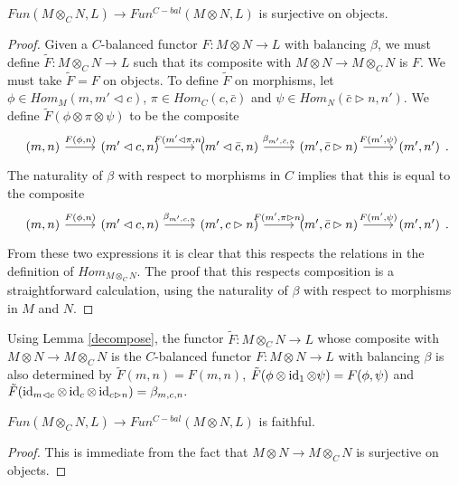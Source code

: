 \begin{lemma}
$Fun(M\otimes_C N,L)\to Fun^{C-bal}(M\otimes N,L)$ is surjective on objects.\end{lemma}
\begin{proof}

Given a $C$-balanced functor $F:M\otimes N \to L$ with balancing $\beta$, we must define $\tilde{F}:M\otimes_C N \to L$ such that its composite with $M\otimes N\to M\otimes_C N$ is $F$. We must take $\tilde{F}=F$ on objects. To define $\tilde{F}$ on morphisms, let $\phi\in Hom_M(m,m'\lhd c)$, $\pi\in Hom_C(c,\bar{c})$ and $\psi\in Hom_N(\bar{c}\rhd n,n')$. We define $\tilde{F}(\phi\otimes\pi\otimes\psi)$ to be the composite \[\begin{tikzcd}
	{(m,n)} & {(m'\lhd c,n)} & {(m'\lhd \bar{c},n)} & {(m',\bar{c}\rhd n)} & {(m',n')}
	\arrow["{F(\phi,n)}", from=1-1, to=1-2]
	\arrow["{F(m'\lhd\pi,n)}", from=1-2, to=1-3]
	\arrow["{\beta_{m',\bar{c},n}}", from=1-3, to=1-4]
	\arrow["{F(m',\psi)}", from=1-4, to=1-5]
\end{tikzcd}.\] The naturality of $\beta$ with respect to morphisms in $C$ implies that this is equal to the composite \[\begin{tikzcd}
	{(m,n)} & {(m'\lhd c,n)} & {(m', c\rhd n)} & {(m',\bar{c}\rhd n)} & {(m',n')}
	\arrow["{F(\phi,n)}", from=1-1, to=1-2]
	\arrow["{\beta_{m',c,n}}", from=1-2, to=1-3]
	\arrow["{F(m',\pi\rhd n)}", from=1-3, to=1-4]
	\arrow["{F(m',\psi)}", from=1-4, to=1-5]
\end{tikzcd}.\] From these two expressions it is clear that this respects the relations in the definition of $Hom_{M\otimes_C N}$. The proof that this respects composition is a straightforward calculation, using the naturality of $\beta$ with respect to morphisms in $M$ and $N$. \end{proof}

\begin{remark}
Using Lemma \ref{decompose}, the functor $\tilde{F}:M\otimes_C N\to L$ whose composite with $M\otimes N\to M\otimes_C N$ is the $C$-balanced functor $F:M\otimes N\to L$ with balancing $\beta$ is also determined by $\tilde{F}(m,n)=F(m,n)$, $\tilde{F}(\phi\otimes\operatorname{id}_1\otimes\psi)=F(\phi,\psi)$ and $\tilde{F}(\operatorname{id}_{m\lhd c}\otimes\operatorname{id}_c\otimes\operatorname{id}_{c\rhd n})=\beta_{m,c,n}.$\end{remark}


\begin{lemma}

$Fun(M\otimes_C N,L)\to Fun^{C-bal}(M\otimes N,L)$ is faithful.\end{lemma}
\begin{proof}

This is immediate from the fact that $M\otimes N \to M\otimes_C N$ is surjective on objects.\end{proof}

